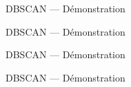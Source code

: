 \begin{frame}{DBSCAN --- Démonstration}
\end{frame}

\begin{frame}{DBSCAN --- Démonstration}
\end{frame}

\begin{frame}{DBSCAN --- Démonstration}
\end{frame}

\begin{frame}{DBSCAN --- Démonstration}
\end{frame}
